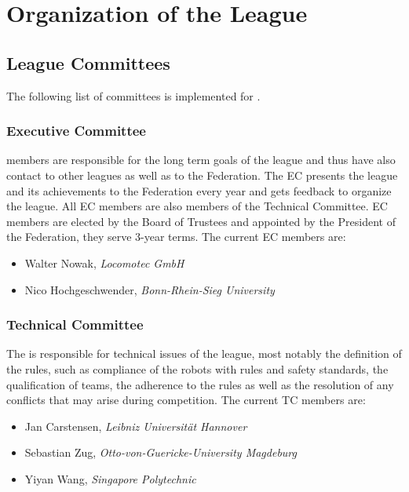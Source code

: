 \section{Organization of the League}\label{sec:organisation_of_the_league}

\subsection{League Committees}
The following list of committees is implemented for \RCAW.

\subsubsection{Executive Committee}

 members are responsible for the long term goals of the league and thus have also contact to other leagues as well as to the \RC Federation. The EC presents the league and its achievements to the \RC Federation every year and gets feedback to organize the league. All EC members are also members of the Technical Committee. EC members are elected by the Board of Trustees and appointed by the President of the \RC Federation, they serve 3-year terms. The current EC members are:

\begin{itemize}
	\item Walter Nowak, \textit{Locomotec GmbH}
	\item Nico Hochgeschwender, \textit{Bonn-Rhein-Sieg University}
\end{itemize}


\subsubsection{Technical Committee}
The  is responsible for technical issues of the league, most notably the definition of the rules, such as compliance of the robots with rules and safety standards, the qualification of teams, the adherence to the rules as well as the resolution of any conflicts that may arise during competition. The current TC members are:

\begin{itemize}
	\item Jan Carstensen, \textit{Leibniz Universit\"at Hannover}
	\item Sebastian Zug, \textit{Otto-von-Guericke-University Magdeburg}
	\item Yiyan Wang, \textit{Singapore Polytechnic}
\end{itemize}



